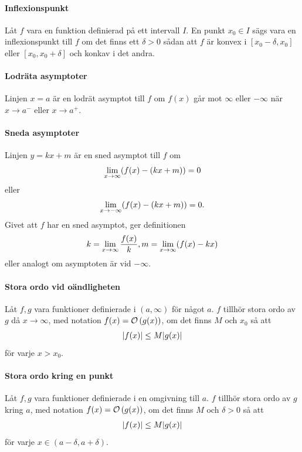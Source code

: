 \paragraph{Inflexionspunkt}
Låt $f$ vara en funktion definierad på ett intervall $I$. En punkt $x_0\in I$ sägs vara en inflexionspunkt till $f$ om det finns ett $\delta > 0$ sådan att $f$ är konvex i $[x_0 - \delta, x_0]$ eller $[x_0, x_0 + \delta]$ och konkav i det andra.

\paragraph{Lodräta asymptoter}
Linjen $x = a$ är en lodrät asymptot till $f$ om $f(x)$ går mot $\infty$ eller $-\infty$ när $x\to a^{-}$ eller $x\to a^{+}$.

\paragraph{Sneda asymptoter}
Linjen $y = kx + m$ är en sned asymptot till $f$ om
\begin{align*}
	\lim\limits_{x\to \infty}(f(x) - (kx + m)) = 0
\end{align*}
eller
\begin{align*}
	\lim\limits_{x\to -\infty}(f(x) - (kx + m)) = 0.
\end{align*}
Givet att $f$ har en sned asymptot, ger definitionen
\begin{align*}
	k = \lim\limits_{x\to \infty}\frac{f(x)}{k}, m = \lim\limits_{x\to \infty}(f(x) - kx)
\end{align*}
eller analogt om asymptoten är vid $-\infty$.

\paragraph{Stora ordo vid oändligheten}
Låt $f, g$ vara funktioner definierade i $(a, \infty)$ för något $a$. $f$ tillhör stora ordo av $g$ då $x\to\infty$, med notation $f(x) = \mathcal{O}\left(g(x)\right)$, om det finns $M$ och $x_0$ så att
\begin{align*}
	\abs{f(x)}\leq M\abs{g(x)}
\end{align*}
för varje $x > x_0$.

\paragraph{Stora ordo kring en punkt}
Låt $f, g$ vara funktioner definierade i en omgivning till $a$. $f$ tillhör stora ordo av $g$ kring $a$, med notation $f(x) = \mathcal{O}\left(g(x)\right)$, om det finns $M$ och $\delta > 0$ så att
\begin{align*}
	\abs{f(x)}\leq M\abs{g(x)}
\end{align*}
för varje $x\in(a - \delta, a + \delta)$.



